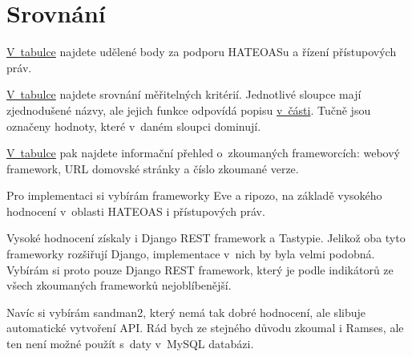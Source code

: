 \section{Srovnání}\label{srovnuxe1nuxed}

\protect\hyperlink{tab:body}{V~tabulce} najdete udělené body za podporu HATEOASu a řízení přístupových práv.

\protect\hyperlink{tab:srovnani}{V~tabulce} najdete srovnání měřitelných kritérií. Jednotlivé sloupce mají zjednodušené názvy, ale jejich funkce odpovídá popisu \protect\hyperlink{kriteria}{v~části}. Tučně jsou označeny hodnoty, které v~daném sloupci dominují.

\protect\hyperlink{tab:informace}{V~tabulce} pak najdete informační přehled o~zkoumaných frameworcích: webový framework, URL domovské stránky a číslo zkoumané verze.

Pro implementaci si vybírám frameworky Eve a ripozo, na základě vysokého hodnocení v~oblasti HATEOAS i přístupových práv.

Vysoké hodnocení získaly i Django REST framework a Tastypie. Jelikož oba tyto frameworky rozšiřují Django, implementace v~nich by byla velmi podobná. Vybírám si proto pouze Django REST framework, který je podle indikátorů ze všech zkoumaných frameworků nejoblíbenější.

Navíc si vybírám sandman2, který nemá tak dobré hodnocení, ale slibuje automatické vytvoření API. Rád bych ze stejného důvodu zkoumal i Ramses, ale ten není možné použít s~daty v~MySQL databázi.

